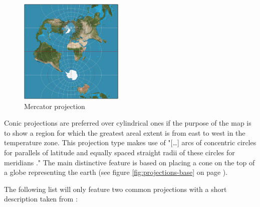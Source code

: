 \begin{enumerate}
\begin{figure}[!htb]
\centering
\includegraphics[height=5cm,keepaspectratio]{images/methods/projections/mercator-transverse.png}
\caption[
    Transverse mercator projection, Urldate: 07.2016 \newline
    \small\texttt{\url{https://upload.wikimedia.org/wikipedia/commons/1/15/MercTranSph.png}}.
]{Mercator projection}
\label{fig:projections-mercator-transverse}
\end{figure}


\end{enumerate}

Conic projections are preferred over cylindrical ones if the purpose of the map is to show a region for which the greatest areal extent is from east to west in the temperature zone. This projection type makes use of "[\ldots] arcs of concentric circles for parallels of latitude and equally spaced straight radii of these circles for meridians ." The main distinctive feature is based on placing a cone on the top of a globe representing the earth (see figure \ref{fig:projections-base} on page \pageref{fig:projections-base}).

The following list will only feature two common projections with a short description taken from \citeauthor{Snyder1987} :

